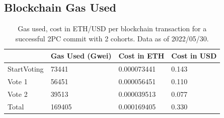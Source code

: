 \documentclass[11pt,sigplan,screen,nonacm]{acmart}
\begin{document}
\begin{appendices}

  \section{Blockchain Gas Used}
  \label{appendix:blockchaingas}

  \begin{table}[hbtp]
    \centering
    \caption{Gas used, cost in ETH/USD per blockchain transaction for a successful 2PC commit with 2 cohorts. Data as of 2022/05/30.}
    \label{table:cost}
    \begin{tabular}{|p{1.8cm}|p{1.8cm}|p{2cm}|p{1.5cm}|}
      \hline
          & Gas Used (Gwei) &  Cost in ETH & Cost in USD \\
          \hline
      StartVoting &73441 &0.000073441 & 0.143\\
      \hline
      Vote 1 &56451	&0.000056451 &0.110\\
      \hline
      Vote 2 &39513 &0.000039513 &0.077\\
      \hline
      Total &169405 &0.000169405 &0.330\\
      \hline
    \end{tabular}
  \end{table}

\end{appendices}
\end{document}
